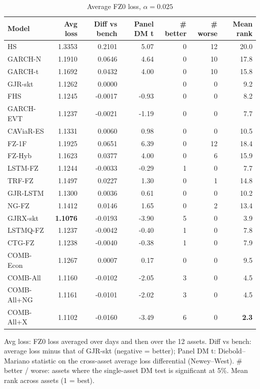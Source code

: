 \begin{table}[htbp]
\centering
\footnotesize
\caption{Average FZ0 loss, $\alpha=0.025$}
\label{tab:loss_a025}
\begin{tabular}{lrrrrrr}
\toprule
Model & Avg loss & Diff vs bench & Panel DM t & \# better & \# worse & Mean rank \\
\midrule
HS & 1.3353 & 0.2101 & 5.07 & 0 & 12 & 20.0 \\
GARCH-N & 1.1910 & 0.0646 & 4.64 & 0 & 10 & 17.8 \\
GARCH-t & 1.1692 & 0.0432 & 4.00 & 0 & 10 & 15.8 \\
GJR-skt & 1.1262 & 0.0000 &  & 0 & 0 & 9.2 \\
FHS & 1.1245 & -0.0017 & -0.93 & 0 & 0 & 8.2 \\
GARCH-EVT & 1.1237 & -0.0021 & -1.19 & 0 & 0 & 7.7 \\
CAViaR-ES & 1.1331 & 0.0060 & 0.98 & 0 & 0 & 10.5 \\
FZ-1F & 1.1925 & 0.0651 & 6.39 & 0 & 12 & 18.4 \\
FZ-Hyb & 1.1623 & 0.0377 & 4.00 & 0 & 6 & 15.9 \\
LSTM-FZ & 1.1244 & -0.0033 & -0.29 & 1 & 0 & 7.7 \\
TRF-FZ & 1.1497 & 0.0227 & 1.30 & 0 & 1 & 14.8 \\
GJR-LSTM & 1.1300 & 0.0036 & 0.61 & 0 & 0 & 10.2 \\
NG-FZ & 1.1412 & 0.0146 & 1.65 & 0 & 2 & 13.4 \\
GJRX-skt & \textbf{1.1076} & -0.0193 & -3.90 & 5 & 0 & 3.9 \\
LSTMQ-FZ & 1.1237 & -0.0042 & -0.40 & 1 & 0 & 7.8 \\
CTG-FZ & 1.1238 & -0.0040 & -0.38 & 1 & 0 & 7.9 \\
COMB-Econ & 1.1267 & 0.0007 & 0.17 & 0 & 0 & 9.5 \\
COMB-All & 1.1160 & -0.0102 & -2.05 & 3 & 0 & 4.5 \\
COMB-All+NG & 1.1161 & -0.0101 & -2.02 & 3 & 0 & 4.5 \\
COMB-All+X & 1.1102 & -0.0160 & -3.49 & 6 & 0 & \textbf{2.3} \\
\bottomrule
\end{tabular}
\par\smallskip\parbox{\linewidth}{\scriptsize Avg loss: FZ0 loss averaged over days and then over the 12 assets. Diff vs bench: average loss minus that of GJR-skt (negative = better); Panel DM t: Diebold--Mariano statistic on the cross-asset average loss differential (Newey--West). \# better / worse: assets where the single-asset DM test is significant at 5\%. Mean rank across assets (1 = best).}
\end{table}